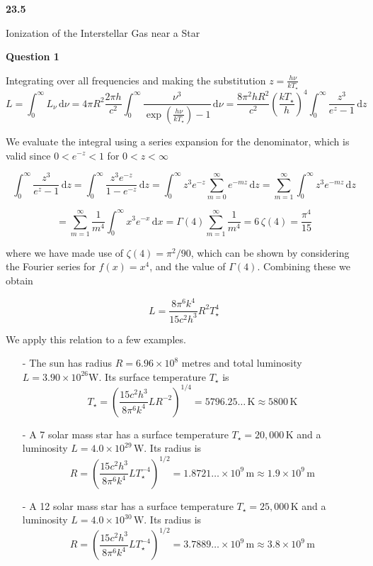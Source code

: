 \documentclass[12pt]{extarticle}
\begin{document}
\begin{flushleft}
\begin{LARGE}
\textbf{23.5}
\end{LARGE}  
\end{flushleft}

\vfill
\begin{center}
\begin{Huge}
Ionization of the Interstellar Gas near a Star
\end{Huge}
\end{center}
\vfill

\pagebreak

\begin{center}
\textbf{Question 1}
\end{center}

Integrating over all frequencies and making the substitution $z =\frac{h \nu}{k T_{\star}}$
$$L = \int_0^{\infty} L_{\nu} \,\mathrm{d}\nu  = 4\pi R^2 \frac{2\pi h}{c^2}\int_0^{\infty} \frac{\nu^3}{\exp(\frac{h \nu}{k T_{\star}})-1} \,\mathrm{d}\nu = \frac{8\pi^2 h R^2}{c^2}\left(\frac{kT_{\star}}{h}\right)^4\int_0^{\infty} \frac{z^3}{e^z-1} \,\mathrm{d}z$$

We evaluate the integral using a series expansion for the denominator, which is valid since $0<e^{-z}<1$ for $0<z<\infty$

$$\int_0^{\infty} \frac{z^3}{e^z-1} \,\mathrm{d}z = \int_0^{\infty} \frac{z^3 e^{-z}}{1-e^{-z}} \,\mathrm{d}z = \int_0^{\infty} z^3 e^{-z}\sum_{m = 0}^{\infty} e^{-mz} \,\mathrm{d}z = \sum_{m = 1}^{\infty}\int_0^{\infty} z^3 e^{-mz}\,\mathrm{d}z$$

$$ = \sum_{m = 1}^{\infty}\frac{1}{m^4}\int_0^{\infty} x^3 e^{-x}\,\mathrm{d}x = \Gamma(4)\sum_{m = 1}^{\infty}\frac{1}{m^4} = 6\, \zeta(4) = \frac{\pi^4}{15}$$

where we have made use of $\zeta(4) = \pi^2/90$, which can be shown by considering the Fourier series for $f(x) = x^4$, and the value of $\Gamma(4)$. Combining these we obtain

$$L = \frac{8\pi^6 k^4}{15 c^2 h^3}R^2T_{\star}^4$$

We apply this relation to a few examples.
\begin{itemize}
\item[-] The sun has radius $R = 6.96 \times 10^8$ metres and total luminosity $L = 3.90 \times 10^{26} \mathrm{W}$. Its surface temperature $T_{\star}$ is 
$$T_{\star} = \left(\frac{15c^2 h^3}{8\pi^6 k^4}L R^{-2} \right)^{1/4} = 5796.25 \ldots\, \mathrm{K} \approx 5800 \,\mathrm{K}$$
\item[-] A 7 solar mass star has a surface temperature $T_{\star} = 20,000\,\mathrm{K}$ and a luminosity $L = 4.0 \times 10^{29} \,\mathrm{W}$. Its radius is
$$R= \left(\frac{15c^2 h^3}{8\pi^6 k^4}L T_{\star}^{-4} \right)^{1/2} = 1.8721 \ldots \times 10^9 \,\mathrm{m} \approx 1.9 \times 10^9 \,\mathrm{m}$$
\item[-] A 12 solar mass star has a surface temperature $T_{\star} = 25,000\,\mathrm{K}$ and a luminosity $L = 4.0 \times 10^{30} \,\mathrm{W}$. Its radius is
$$R= \left(\frac{15c^2 h^3}{8\pi^6 k^4}L T_{\star}^{-4} \right)^{1/2} =3.7889  \ldots \times 10^9 \,\mathrm{m} \approx 3.8 \times 10^9 \,\mathrm{m}$$
\end{itemize}
\end{document}
